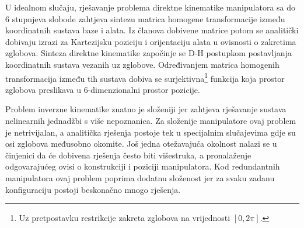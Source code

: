 \documentclass[times, utf8, diplomski, numeric]{fer}
\begin{document}
U idealnom slučaju, rješavanje problema direktne kinematike manipulatora sa do 6 stupnjeva slobode zahtjeva sintezu matrica homogene transformacije između koordinatnih sustava baze i alata.
Iz članova dobivene matrice potom se analitički dobivaju izrazi za Kartezijsku poziciju i orijentaciju alata u ovisnosti o zakretima zglobova.
Sinteza direktne kinematike započinje se D-H postupkom \cite{uicker1964iterative} postavljanja koordinatnih sustava vezanih uz zglobove.
Određivanjem matrica homogenih transformacija između tih sustava dobiva se surjektivna\footnote{Uz pretpostavku restrikcije zakreta zglobova na vrijednosti $[0,2\pi]$.} funkcija koja prostor zglobova preslikava u 6-dimenzionalni prostor pozicije.

Problem inverzne kinematike znatno je složeniji jer zahtjeva rješavanje sustava nelinearnih jednadžbi s više nepoznanica.
Za složenije manipulatore  ovaj problem je netrivijalan, a analitička rješenja postoje tek u specijalnim slučajevima gdje su osi zglobova međusobno okomite.
Još jedna otežavajuća okolnost nalazi se u činjenici da će dobivena rješenja često biti višestruka, a pronalaženje odgovarajućeg ovisi o konstrukciji i poziciji manipulatora.
Kod redundantnih manipulatora ovaj problem poprima dodatnu složenost jer za svaku zadanu konfiguraciju postoji beskonačno mnogo rješenja.
\end{document}
